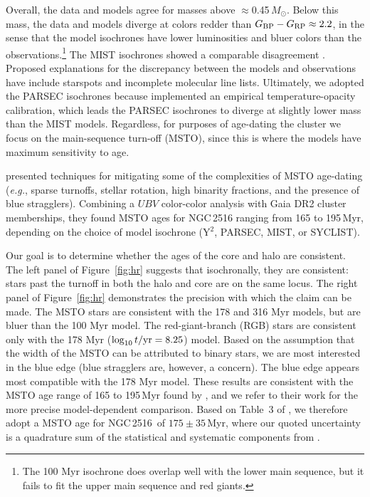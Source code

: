 \documentclass[12pt,twocolumn,tighten]{aastex63}
\newcommand{\cn}{NGC\,2516} %
\newcommand{\bpmrp}{G_{\rm BP}-G_{\rm RP}}
\begin{document}
Overall, the data and models agree for masses above
$\approx$0.45\,$M_\odot$.  Below this mass, the data and models
diverge at colors redder than $\bpmrp\approx2.2$, in
the sense that the model isochrones have lower luminosities and bluer
colors than the observations.\footnote{The 100 Myr isochrone does
overlap well with the lower main sequence, but it fails to fit the
upper main sequence and red giants.}  The MIST isochrones showed a
comparable disagreement \citep{choi_mesa_2016}.  Proposed explanations
for the discrepancy between the models and observations have include
starspots and incomplete molecular line lists\citep[{\it
e.g.},][]{stauffer_why_2003,feiden_magnetic_2013,rajpurohit_effective_2013,mann_spectrothermometry_2013,choi_mesa_2016}.
Ultimately, we adopted the PARSEC isochrones because
\citet{chen_improving_2014} implemented an empirical
temperature-opacity calibration, which leads the PARSEC isochrones to
diverge at slightly lower mass than the MIST models.  Regardless, for
purposes of age-dating the cluster we focus on the main-sequence
turn-off (MSTO), since this is where the models have maximum
sensitivity to age.

\citet{cummings_2018} presented techniques for mitigating some of the
complexities of MSTO age-dating ({\it e.g.}, sparse turnoffs, stellar
rotation, high binarity fractions, and the presence of blue
stragglers).  Combining a $UBV$ color-color analysis with Gaia DR2
cluster memberships, they found MSTO ages for NGC\,2516 ranging from
165 to 195\,Myr, depending on the choice of model isochrone (Y$^2$,
PARSEC, MIST, or SYCLIST).

Our goal is to determine whether the ages of the core and halo are
consistent.  The left panel of Figure~\ref{fig:hr} suggests that
isochronally, they are consistent: stars past the turnoff in both the
halo and core are on the same locus.  The right panel of
Figure~\ref{fig:hr} demonstrates the precision with which the claim
can be made.  The MSTO stars are consistent with the 178 and 316 Myr
models, but are bluer than the 100 Myr model.  The red-giant-branch
(RGB) stars are consistent only with the 178 Myr ($\log_{10} t/{\rm
yr} = 8.25$) model.  Based on the assumption that the width of the
MSTO can be attributed to binary stars, we are most interested in the
blue edge (blue stragglers are, however, a concern).  The blue edge
appears most compatible with the 178 Myr model.  These results are
consistent with the MSTO age range of 165 to 195\,Myr found by
\citet{cummings_2018}, and we refer to their work for the more precise
model-dependent comparison.  Based on Table~3 of
\citet{cummings_2018}, we therefore adopt a MSTO age for \cn\ of
$175\pm35$\,Myr, where our quoted uncertainty is a quadrature sum of
the statistical and systematic components from \cite{cummings_2018}. 
\end{document}
